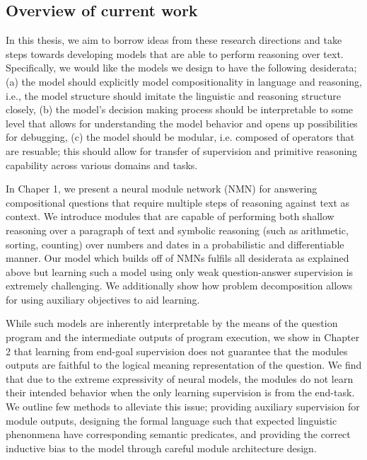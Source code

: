 \documentclass[main.tex]{subfiles}
\begin{document}


\subsection{Overview of current work}
In this thesis, we aim to borrow ideas from these research directions and take steps towards developing models that are able to perform reasoning over text.  Specifically, we would like the models we design to have the following desiderata; (a) the model should explicitly model compositionality in language and reasoning, i.e., the model structure should imitate the linguistic and reasoning structure closely, (b) the model's decision making process should be interpretable to some level that allows for understanding the model behavior and opens up possibilities for debugging, (c) the model should be modular, i.e. composed of operators that are resuable; this should allow for transfer of supervision and primitive reasoning capability across various domains and tasks.

In Chaper 1, we present a neural module network (NMN) for answering compositional questions that require multiple steps of reasoning against text as context.  We introduce modules that are capable of performing both shallow reasoning over a paragraph of text and symbolic reasoning (such as arithmetic, sorting, counting) over numbers and dates in a probabilistic and differentiable manner.  Our model which builds off of NMNs fulfils all desiderata as explained above but learning such a model using only weak question-answer supervision is extremely challenging.  We additionally show how problem decomposition allows for using auxiliary objectives to aid learning.

While such models are inherently interpretable by the means of the question program and the intermediate outputs of program execution, we show in Chapter 2 that learning from end-goal supervision does not guarantee that the modules outputs are faithful to the logical meaning representation of the question.  We find that due to the extreme expressivity of neural models, the modules do not learn their intended behavior when the only learning supervision is from the end-task.  We outline few methods to alleviate this issue; providing auxiliary supervision for module outputs, designing the formal language such that expected linguistic phenonmena have corresponding semantic predicates, and providing the correct inductive bias to the model through careful module architecture design.
\end{document}
